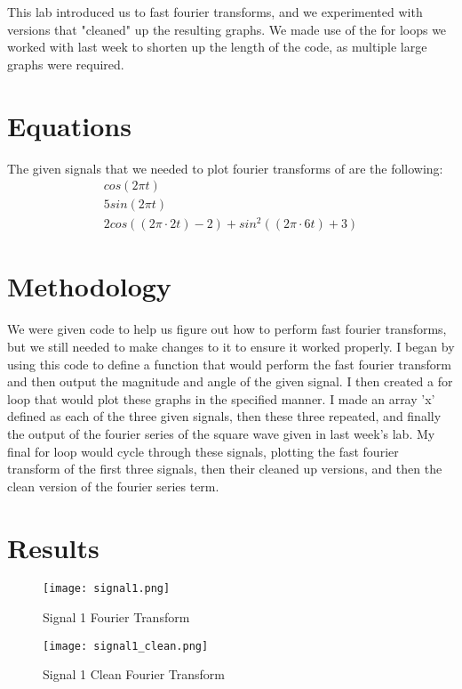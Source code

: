 \documentclass[12pt]{report}
\begin{document}
This lab introduced us to fast fourier transforms, and we experimented with versions that "cleaned" up the resulting graphs. We made use of the for loops we worked with last week to shorten up the length of the code, as multiple large graphs were required. 
 

\section{Equations}

The given signals that we needed to plot fourier transforms of are the following:
\begin{align}
    cos(2\pi t) \\
    5sin(2\pi t) \\
    2cos((2\pi \cdot 2t)-2)+sin^2((2\pi \cdot 6t)+3)
\end{align}

 \section{Methodology}

We were given code to help us figure out how to perform fast fourier transforms, but we still needed to make changes to it to ensure it worked properly. I began by using this code to define a function that would perform the fast fourier transform and then output the magnitude and angle of the given signal. I then created a for loop that would plot these graphs in the specified manner. I made an array 'x' defined as each of the three given signals, then these three repeated, and finally the output of the fourier series of the square wave given in last week's lab. My final for loop would cycle through these signals, plotting the fast fourier transform of the first three signals, then their cleaned up versions, and then the clean version of the fourier series term. 

\newpage
 \section{Results}
 
\begin{figure}[H]
    \centering
    \texttt{[image: signal1.png]}
    \caption{Signal 1 Fourier Transform}
\end{figure}

\begin{figure}[H]
    \centering
    \texttt{[image: signal1\_clean.png]}
    \caption{Signal 1 Clean Fourier Transform}
\end{figure}
\end{document}
